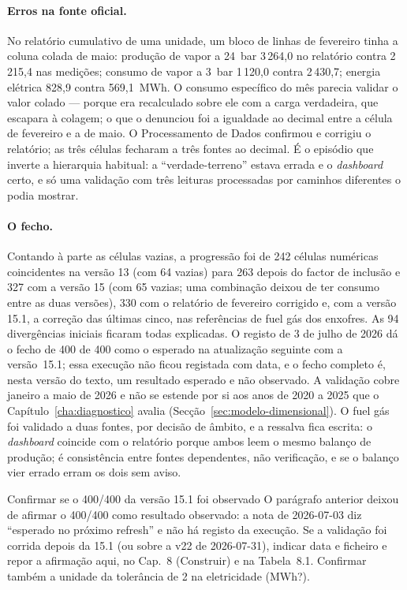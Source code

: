 \paragraph{Erros na fonte oficial.} No relatório cumulativo de uma
unidade, um bloco de linhas de fevereiro tinha a coluna colada de maio:
produção de vapor a 24~bar 3\,264,0 no relatório contra 2\,215,4 nas
medições; consumo de vapor a 3~bar 1\,120,0 contra 2\,430,7; energia
elétrica 828,9 contra 569,1~MWh. O consumo específico do mês parecia
validar o valor colado --- porque era recalculado sobre ele com a carga
verdadeira, que escapara à colagem; o que o denunciou foi a igualdade ao
decimal entre a célula de fevereiro e a de maio. O Processamento de Dados
confirmou e corrigiu o relatório; as três células fecharam a três fontes
ao decimal. É o episódio que inverte a hierarquia habitual: a
``verdade-terreno'' estava errada e o \emph{dashboard} certo, e só uma
validação com três leituras processadas por caminhos diferentes o podia
mostrar.

\paragraph{O fecho.} Contando à parte as células vazias, a progressão foi
de 242 células numéricas coincidentes na versão 13 (com 64 vazias) para 263
depois do factor de inclusão e 327 com a versão 15 (com 65 vazias; uma
combinação deixou de ter consumo entre as duas versões), 330 com o
relatório de fevereiro corrigido e, com a versão 15.1, a correção das
últimas cinco, nas referências de fuel gás dos enxofres. As 94 divergências
iniciais ficaram todas explicadas. O registo de 3 de julho de 2026 dá o
fecho de 400 de 400 como o esperado na atualização seguinte com a
versão~15.1; essa execução não ficou registada com data, e o fecho completo
é, nesta versão do texto, um resultado esperado e não observado. A
validação cobre janeiro a maio de 2026 e não se estende por si aos anos de
2020 a 2025 que o Capítulo~\ref{cha:diagnostico} avalia
(Secção~\ref{sec:modelo-dimensional}).
O fuel gás foi validado a duas fontes, por decisão de âmbito, e a
ressalva fica escrita: o \emph{dashboard} coincide com o relatório porque
ambos leem o mesmo balanço de produção; é consistência entre fontes
dependentes, não verificação, e se o balanço vier errado erram os dois
sem aviso.

{Confirmar se o 400/400 da versão 15.1 foi observado}
{O parágrafo anterior deixou de afirmar o 400/400 como resultado observado:
a nota de 2026-07-03 diz ``esperado no próximo refresh'' e não há registo
da execução. Se a validação foi corrida depois da 15.1 (ou sobre a v22 de
2026-07-31), indicar data e ficheiro e repor a afirmação aqui, no
Cap.~8 (Construir) e na Tabela~8.1. Confirmar também a unidade da tolerância
de 2 na eletricidade (MWh?).}%
